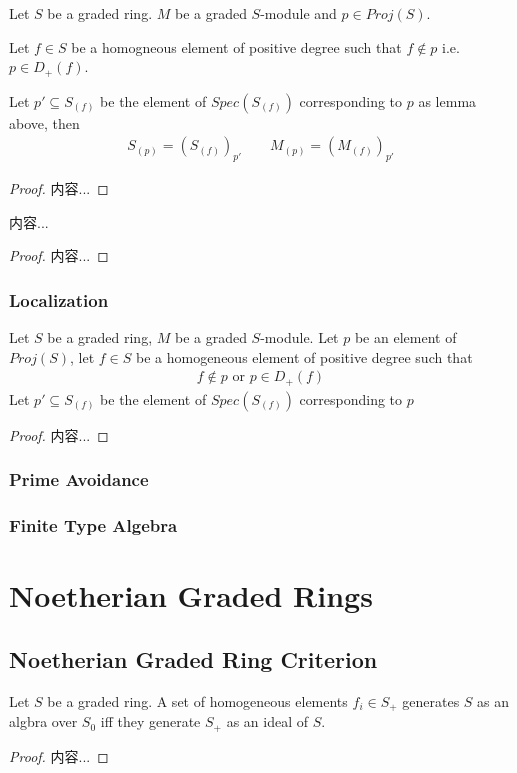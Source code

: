 \documentclass[Total.tex]{subfiles}
\begin{document}
			\begin{lemma}
				Let $S$ be a graded ring. $M$ be a graded $S$-module and $p\in Proj(S)$.
				
				Let $f\in S$ be a homogneous element of positive degree such that $f\notin p$ i.e. $p\in D_+(f)$.
				
				Let $p'\subseteq S_{(f)}$ be the element of $Spec(S_{(f)})$ corresponding to $p$ as lemma above, then
				\begin{gather*}
					S_{(p)}=(S_{(f)})_{p'}\qquad M_{(p)}=(M_{(f)})_{p'}
				\end{gather*}
			\end{lemma}
			\begin{proof}
				内容...
			\end{proof}
			
			\begin{lemma}
				内容...
			\end{lemma}
			\begin{proof}
				内容...
			\end{proof}
			
			\subsubsection{Localization}
				\begin{lemma}
					Let $S$ be a graded ring, $M$ be a graded $S$-module. Let $p$ be an element of $Proj(S)$, let $f\in S$ be a homogeneous element of positive degree such that
					\begin{gather*}
						f\notin p\mbox{ or }p\in D_+(f)
					\end{gather*}
					Let $p'\subseteq S_{(f)}$ be the element of $Spec(S_{(f)})$ corresponding to $p$
				\end{lemma}
				\begin{proof}
					内容...
				\end{proof}
			\subsubsection{Prime Avoidance}
			\subsubsection{Finite Type Algebra}
			\section{Noetherian Graded Rings}
			\subsection{Noetherian Graded Ring Criterion}
			\begin{lemma}
				Let $S$ be a graded ring. A set of homogeneous elements $f_i\in S_+$ generates $S$ as an algbra over $S_0$ iff they generate $S_+$ as an ideal of $S$.
			\end{lemma}
			\begin{proof}
				内容...
			\end{proof}
			
\end{document}
